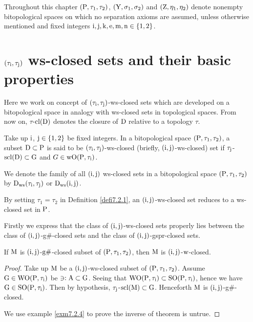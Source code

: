 Throughout this chapter $(\mathrm{P}, \tau_1, \tau_2)$, $(\mathrm{Y}, \sigma_{1}, \sigma_{2} )$ and $(\mathrm{Z}, \eta_{1}, \eta_{2})$ denote nonempty bitopological spaces on which no separation axioms are assumed, unless otherwise mentioned and fixed integers $\mathrm{i}, \mathrm{j}, \mathrm{k}, \mathrm{e}, \mathrm{m}, \mathrm{n}\in \{1, 2\}$.

\section{\boldmath$(\tau_{\mathrm{i}}, \tau_{\mathrm{j}})$ ws-closed sets and their basic properties}

Here we work on concept of $(\tau_{\mathrm{i}}, \tau_{\mathrm{j}})$-ws-closed sets which are developed on a bitopological space in analogy with ws-closed sets in topological spaces. From now on, $\tau$-$\mathrm{cl}(\mathrm{D})$ denotes the closure of $\mathrm{D}$ relative to a topology $\tau$.

\begin{dfn}\label{defi7.2.1}
Take up $\mathrm{i}$, $\mathrm{j} \in \{1, 2\}$ be fixed integers. In a bitopological space $(\mathrm{P}, \tau_1, \tau_2)$, a subset $\mathrm{D} \subset \mathrm{P}$ is said to be $(\tau_{\mathrm{i}}, \tau_{\mathrm{j}})$-ws-closed (briefly, $(\mathrm{i}, \mathrm{j})$-ws-closed) set if $\tau_{\mathrm{j}}$-$\mathrm{scl}(\mathrm{D}) \subset \mathrm{G}$ and $G \in \mathrm{w}\mathrm{O}(\mathrm{P}, \tau_{\mathrm{i}})$.
\end{dfn}

We denote the family of all $(\mathrm{i}, \mathrm{j})$ ws-closed sets in a bitopological space $(\mathrm{P}, \tau_1, \tau_2)$ by $\mathrm{D}_{\mathrm{ws}}(\tau_{\mathrm{i}}, \tau_{\mathrm{j}})$ or $\mathrm{D}_{\mathrm{ws}}(\mathrm{i}, \mathrm{j})$.

\begin{rem}\label{rem7.2.2}
By setting $\tau_1 = \tau_2$ in Definition \ref{defi7.2.1}, an $(\mathrm{i}, \mathrm{j})$-ws-closed set reduces to a ws-closed set in $\mathrm{P}$.
\end{rem}

Firstly we express that the class of $(\mathrm{i}, \mathrm{j})$-ws-closed sets properly lies between the class of $(\mathrm{i}, \mathrm{j})$-g\#-closed sets and the class of $(\mathrm{i}, \mathrm{j})$-gspr-closed sets.

\begin{thm}\label{thm7.2.3}
If $\mathrm{M}$ is $(\mathrm{i}, \mathrm{j})$-$\mathrm{g}\#$-closed subset of $(\mathrm{P}, \tau_1, \tau_2)$, then $\mathrm{M}$ is $(\mathrm{i}, \mathrm{j})$-$\mathrm{w}$-closed.
\end{thm}

\begin{proof}
Take up $\mathrm{M}$ be a $(\mathrm{i}, \mathrm{j})$-ws-closed subset of $(\mathrm{P}, \tau_1, \tau_2)$. Assume $\mathrm{G}\in \mathrm{W}\mathrm{O}(\mathrm{P}, \tau_{\mathrm{i}})$ be $\ni: \mathrm{A}\subset \mathrm{G}$. Seeing that $\mathrm{W}\mathrm{O}(\mathrm{P}, \tau_{\mathrm{i}}) \subset \mathrm{S}\mathrm{O}(\mathrm{P}, \tau_{\mathrm{i}})$, hence we have $\mathrm{G}\in\mathrm{S}\mathrm{O}(\mathrm{P}, \tau_{\mathrm{i}})$. Then by hypothesis, $\tau_{\mathrm{j}}$-$\mathrm{scl}(\mathrm{M}) \subset \mathrm{G}$. Henceforth $\mathrm{M}$ is $(\mathrm{i}, \mathrm{j})$-g\#-closed.

We use example \ref{exm7.2.4} to prove the inverse of theorem is untrue.
\end{proof}

